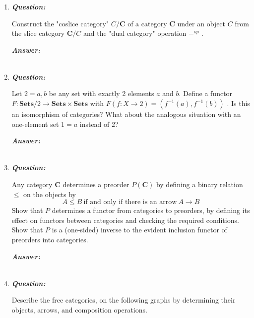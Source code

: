 \documentclass{article}
\begin{document}
\begin{enumerate}
	\item
	      \textbf{\textit{Question:}}

	      Construct the "coslice category" $ C / \textbf{C}  $ of a category \textbf{C} under an object $ C $ from the slice category $ \textbf{C} / C $ and the "dual category" operation $ -^{op} $ .

	      \textbf{\textit{Answer:}}

	      \begin{align*}
	      \end{align*}



	\item
	      \textbf{\textit{Question:}}

	      Let $ 2 = {a,b} $ be any set with exactly 2 elements $ a $ and $ b $. Define a functor $ F : \textbf{Sets} / 2 \to \textbf{Sets} \times \textbf{Sets}  $ with $ F(f : X \to 2) = (f^{-1}(a), f^{-1}(b)) $ . Is this an isomorphism of categories? What about the analogous situation with an one-element set $ 1 = {a} $ instead of 2?


	      \textbf{\textit{Answer:}}

	      \begin{align*}
	      \end{align*}



	\item
	      \textbf{\textit{Question:}}

	      Any category \textbf{C} determines a preorder $ P(\textbf{C} ) $ by defining a binary relation $ \leq  $ on the objects by
	      \[
		      A \leq B \ \text{if and only if there is an arrow} \  A \to B
	      \]
	      Show that $ P $ determines a functor from categories to preorders, by defining its effect on functors between categories and checking the required conditions. Show that $ P $ is a (one-sided) inverse to the evident inclusion functor of preorders into categories.

	      \textbf{\textit{Answer:}}

	      \begin{align*}
	      \end{align*}



	\item
	      \textbf{\textit{Question:}}

	      Describe the free categories, on the following graphs by determining their objects, arrows, and composition operations.
	      \begin{enumerate}


\end{enumerate}
\end{enumerate}
\end{document}
